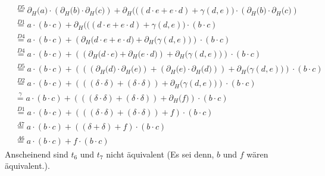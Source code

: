 \documentclass[a4paper]{scrartcl}
\begin{document}
\begin{enumerate}
\begin{equation}
\begin{split}
                &\stackrel{D5}{=} \partial_H \Big( a \Big) \cdot \left( \partial_H \Big( b \Big) \cdot \partial_H \Big( c \Big) \right)
                    + \partial_H \Big( ((d \cdot e + e \cdot d) + \gamma(d,e) \Big) \cdot \left( \partial_H \Big( b \Big) \cdot \partial_H \Big( c \Big) \right) \\
                &\stackrel{D1}{=} a \cdot (b \cdot c)
                    + \partial_H \Big( ((d \cdot e + e \cdot d) + \gamma(d,e) \Big) \cdot (b \cdot c) \\
                &\stackrel{D4}{=} a \cdot (b \cdot c)
                    + \left( \partial_H \Big( d \cdot e + e \cdot d \Big) + \partial_H \Big( \gamma(d,e) \Big) \right) \cdot (b \cdot c) \\
                &\stackrel{D4}{=} a \cdot (b \cdot c)
                    + \left( \left( \partial_H \Big( d \cdot e \Big) + \partial_H \Big( e \cdot d \Big) \right) + \partial_H \Big( \gamma(d,e) \Big) \right) \cdot (b \cdot c) \\
                &\stackrel{D5}{=} a \cdot (b \cdot c)
                    + \left( \left( \left( \partial_H \Big( d \Big) \cdot \partial_H \Big( e \Big) \right) + \left( \partial_H \Big( e  \Big) \cdot \partial_H \Big( d \Big) \right) \right) + \partial_H \Big( \gamma(d,e) \Big) \right) \cdot (b \cdot c) \\
                &\stackrel{D2}{=} a \cdot (b \cdot c)
                    + \left( \left( \left( \delta \cdot \delta \right) + \left( \delta \cdot \delta \right) \right) + \partial_H \Big( \gamma(d,e) \Big) \right) \cdot (b \cdot c) \\
                &\stackrel{\gamma}{=} a \cdot (b \cdot c)
                    + \left( \left( \left( \delta \cdot \delta \right) + \left( \delta \cdot \delta \right) \right) + \partial_H \Big( f \Big) \right) \cdot (b \cdot c) \\
                &\stackrel{D1}{=} a \cdot (b \cdot c)
                    + \left( \left( \left( \delta \cdot \delta \right) + \left( \delta \cdot \delta \right) \right) + f \right) \cdot (b \cdot c) \\
                &\stackrel{A7}{=} a \cdot (b \cdot c)
                    + \left( \left( \delta + \delta \right) + f \right) \cdot (b \cdot c) \\
                &\stackrel{A6}{=} a \cdot (b \cdot c) + f \cdot (b \cdot c)
            \end{split}
        \end{equation}
        Anscheinend sind $t_6$ und $t_7$ nicht äquivalent
        (Es sei denn, $b$ und $f$ wären äquivalent.).

\end{enumerate}
\end{document}
